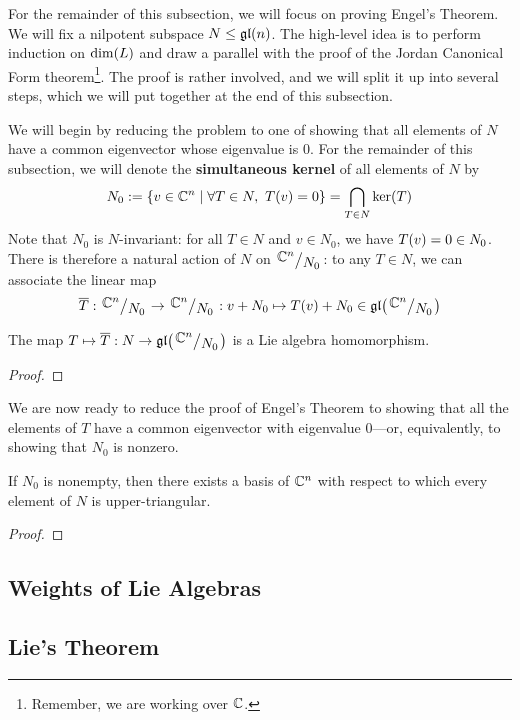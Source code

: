 For the remainder of this subsection, we will focus on proving Engel's Theorem. We will fix a nilpotent subspace $N \leq \mathfrak{gl}\!\left( n \right)$. The high-level idea is to perform induction on $\dim\!\left( L \right)$ and draw a parallel with the proof of the Jordan Canonical Form theorem\footnote{Remember, we are working over $\mathbb{C}$.}. The proof is rather involved, and we will split it up into several steps, which we will put together at the end of this subsection.

We will begin by reducing the problem to one of showing that all elements of $N$ have a common eigenvector whose eigenvalue is $0$. For the remainder of this subsection, we will denote the \textbf{simultaneous kernel} of all elements of $N$ by
\begin{align}
    N_0 := \left\{ v \in \mathbb{C}^n \; \middle\vert \; \forall T \in N, \ T\!\left( v \right) = 0 \right\} = \bigcap_{T \in N} \operatorname{ker}\!\left( T \right)
    \label{Ch1:Eq:Simultaneous_Kernel_Def}
\end{align}
Note that $N_0$ is $N$-invariant: for all $T \in N$ and $v \in N_0$, we have $T\!\left( v \right) = 0 \in N_0$. There is therefore a natural action of $N$ on $\quotient{\C^n}{N_0}$: to any $T \in N$, we can associate the linear map
\begin{align}
    \Tbar : \quotient{\C^n}{N_0} \to \quotient{\C^n}{N_0} : v + N_0 \mapsto \Tv + N_0 \in \gl{\quotient{\C^n}{N_0}}
\end{align}

\begin{lemma}
    The map $T \mapsto \Tbar : N \to \gl{\quotient{\C^n}{N_0}}$ is a Lie algebra homomorphism.
\end{lemma}
\begin{proof}
    \sorry
\end{proof}

We are now ready to reduce the proof of Engel's Theorem to showing that all the elements of $T$ have a common eigenvector with eigenvalue $0$---or, equivalently, to showing that $N_0$ is nonzero.

\begin{lemma}
    If $N_0$ is nonempty, then there exists a basis of $\mathbb{C}^n$ with respect to which every element of $N$ is upper-triangular.
\end{lemma}
\begin{proof}
    \sorry
\end{proof}

\subsection{Weights of Lie Algebras}

\subsection{Lie's Theorem}

